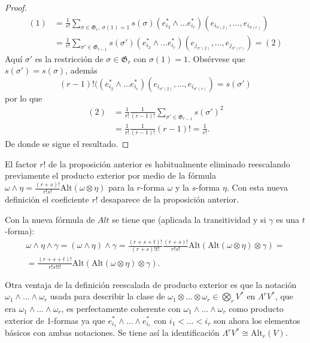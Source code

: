 \documentclass[../VD.tex]{subfiles}
\begin{document}
\begin{proof}
\begin{equation}
  \label{proof:prop-alt-2}
  \begin{aligned}
  (1) &= \frac{1}{r!} \sum_{\sigma\in \mathfrak{G}_r, \ \sigma(1)=1}
    s(\sigma)(e_{i_2}^{*} \wedge \dots e_{i_r}^{*})
    (e_{i_{\sigma(2)}}, \dots, e_{i_{\sigma(r)}})\\
    &=\frac{1}{r!} \sum_{\sigma'\in \mathfrak{G}_{r-1}} s(\sigma')(e_{i_2}^{*} \wedge \dots
    e_{i_r}^{*}) (e_{j_{\sigma'(2)}}, \dots, e_{j_{\sigma'(r)}}) = (2)
  \end{aligned}
\end{equation}
 Aquí \(\sigma'\) es la restricción de \(\sigma \in \mathfrak{G}_r\) con \(\sigma(1) = 1\). Obsérvese que \( s(\sigma')= s(\sigma) \), además  
\[
(r-1)!((e_{i_2}^*\wedge\ldots e_{i_r}^*)(e_{i_{\sigma'(2)}},\ldots, e_{i_{\sigma'(r)}})= s(\sigma')
\]
por lo que
\begin{align*}
(2) &=\frac{1}{r!}\frac{1}{(r-1)!}\sum_{\sigma'\in \mathfrak{G}_{r-1}}s(\sigma')^2\\
&=\frac{1}{r!}\frac{1}{(r-1)!}(r-1)! =\frac{1}{r!}.
\end{align*}
De donde se sigue el resultado.
\end{proof}

\begin{remark}\label{rem:reescalado}
  El factor \(r!\) de la proposición anterior es habitualmente eliminado reescalando previamente el producto exterior por medio de la fórmula
  \(\omega\wedge\eta=\frac{(r+s)!}{r!s!}\text{Alt}(\omega\otimes\eta)\) para la
  \(r\)-forma \(\omega\) y la \(s\)-forma \(\eta\). Con esta nueva definición el
  coeficiente \(r!\) desaparece de la proposición anterior.

  Con la nueva fórmula de \(Alt\) se tiene que (aplicada la transitividad y si
  \(\gamma\) es una $t$-forma):
  \[\begin{array}{c}
      \omega\wedge\eta\wedge\gamma=(\omega\wedge\eta)\wedge\gamma=
      \frac{(r+s+t)!}{(r+s)!t!}\frac{(r+s)!}{r!s!}\text{Alt}
      (\text{Alt}(\omega\otimes\eta)\otimes\gamma)= \\
      =\frac{(r+s+t)!}{r!s!t!}\text{Alt}(\text{Alt}(\omega\otimes\eta)\otimes\gamma).
    \end{array}\]
\end{remark}

\begin{remark}
  Otra ventaja de la definición reescalada de producto exterior es que la
  notación \(\omega_1\wedge \ldots \wedge \omega_r\) usada para describir la clase de
  \(\omega_{1}\otimes\dots\otimes\omega_{r}\in\bigotimes_{r}V^{*}\) en
  \(\Lambda^{r}V^{*}\), que era \(\omega_{1}\wedge\dots\wedge\omega_{r}\), es perfectamente 
  coherente con \(\omega_{1}\wedge\dots\wedge\omega_{r}\) como producto exterior
  de 1-formas ya que \(e_{i_{1}}^{*}\wedge\dots\wedge e_{i_{r}}^{*}\) con
  \(i_{1}<\dots<i_{r}\) son ahora los elementos básicos con ambas notaciones. Se
  tiene así la identificación \(\Lambda^{r}V^{*}\cong\text{Alt}_{r}(V)\).
\end{remark}
\end{document}
